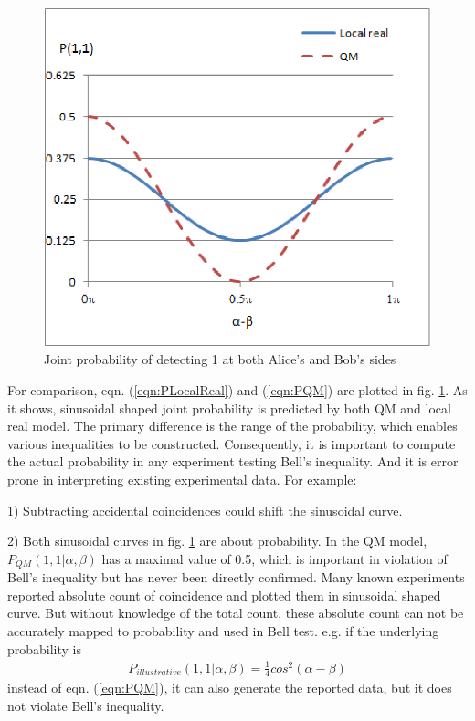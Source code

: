 \documentclass[prd,showpacs,twocolumn]{revtex4-1}
\begin{document}
\begin{figure}
\includegraphics[scale=0.7]{prob-png.eps}
\caption{Joint probability of detecting 1 at both Alice's and Bob's sides}
\label{fig:Probability}
\end{figure}

For comparison, eqn. (\ref{eqn:PLocalReal}) and (\ref{eqn:PQM}) are plotted in fig. \ref{fig:Probability}. As it shows, sinusoidal shaped joint probability is predicted by both QM and local real model. The primary difference is the range of the probability, which enables various inequalities to be constructed. Consequently, it is important to compute the actual probability in any experiment testing Bell's inequality. And it is error prone in interpreting existing experimental data. For example:

1) Subtracting accidental coincidences could shift the sinusoidal curve.

2) Both sinusoidal curves in fig. \ref{fig:Probability} are about probability. In the QM model, $P_{QM}(1,1|\alpha,\beta)$ has a maximal value of 0.5, which is important in violation of Bell's inequality but has never been directly confirmed. Many known experiments reported absolute count of coincidence and plotted them in sinusoidal shaped curve. But without knowledge of the total count, these absolute count can not be accurately mapped to probability and used in Bell test. e.g. if the underlying probability is
\begin{eqnarray}
P_{illustrative}(1,1|\alpha,\beta)=\frac{1}{4}cos^2(\alpha-\beta)
\end{eqnarray}
instead of eqn. (\ref{eqn:PQM}), it can also generate the reported data, but it does not violate Bell's inequality.
\end{document}
